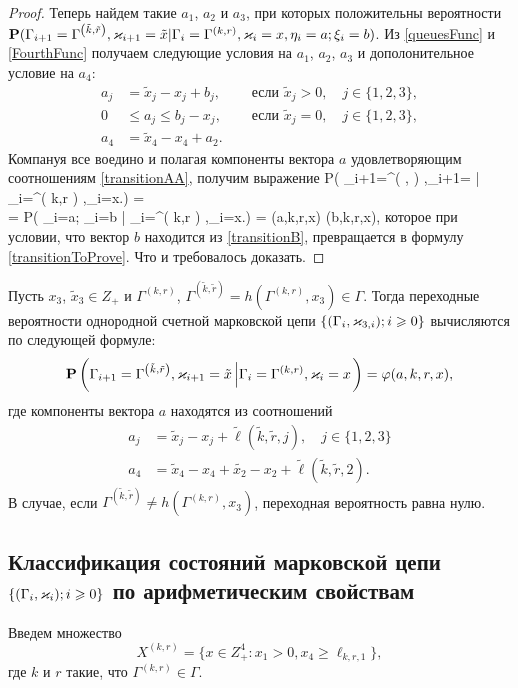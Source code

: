 \documentclass[a4paper,12pt,russian]{extarticle}
\newcommand{\G}{\Gamma}
\newcommand{\Mark}{\{(\G_i, \vk_i); i \geqslant 0\}}
\newcommand{\MarkThree}{\{(\G_i, \vk_{3,i}); i \geqslant 0\}}
\newcommand{\ga}[1]{\Gamma^{\left( #1 \right)} }
\renewcommand{\Pr}{{\mathbf P}}
\renewcommand{\P}[2]{\Pr\left( #1 \left| #2\right.\right)}
\begin{document}
\begin{proof}
Теперь найдем такие $a_1$, $a_2$ и $a_3$, при которых положительны вероятности $\Pr (\G_{i+1}=\ga{\tilde{k},\tilde{r}},\vk_{i+1}=\tilde{x}|\G_{i}=\ga{k,r},\vk_i=x, \eta_i=a; \xi_i=b)$. Из \eqref{queuesFunc} и \eqref{FourthFunc} получаем следующие условия на $a_1$, $a_2$, $a_3$ и дополонительное условие на $a_4$:
\begin{equation}
\begin{aligned}
a_j &=\tilde{x}_j - x_j + b_j, \quad &\text{ если } \tilde{x}_j >0, \quad j \in \{1, 2, 3\}, \\
0 &\leqslant a_j \leqslant  b_j - x_j, \quad &\text{ если } \tilde{x}_j =0, \quad j \in \{1, 2, 3\},\\
a_4 &= \tilde{x}_4 - x_4 +a_2.
\end{aligned}
\label{transitionAA}
\end{equation}
Компануя все воедино и полагая компоненты вектора $a$ удовлетворяющим соотношениям \eqref{transitionAA}, получим выражение
\ml
{
\P{\G_{i+1}=\ga{,},\vk_{i+1}=}{\G_{i}=\ga{k,r},\vk_i=x} = \\
= \P{\eta_i=a; \xi_i=b}{\G_{i}=\ga{k,r},\vk_i=x} = \vp(a,k,r,x)  \times \psi(b,k,r,x),
}
которое при условии, что вектор $b$ находится из \eqref{transitionB}, превращается в формулу \eqref{transitionToProve}. Что и требовалось доказать.
\end{proof}

\begin{theorem}
Пусть $x_3$, $\tilde{x}_3\in Z_+$ и $\ga{k,r}$, $\ga{\tilde{k},\tilde{r}}=h(\ga{k,r},x_3) \in \G$. Тогда переходные вероятности однородной счетной марковской цепи $\MarkThree$ вычисляются по следующей формуле:
\begin{equation}
\P{\G_{i+1}=\ga{\tilde{k},\tilde{r}},\vk_{i+1}=\tilde{x}}{\G_{i}=\ga{k,r},\vk_i=x} 
= \vp(a,k,r,x),
\label{transitionToProve}
\end{equation}
где компоненты вектора $a$ находятся из соотношений
\begin{align}
a_j&=\tilde{x}_j-x_j+\tilde{\ell}(\tilde{k},\tilde{r},j), \quad j\in\{1, 2, 3\}\\
a_4&=\tilde{x}_4-x_4+\tilde{x_2}-x_2+\tilde{\ell}(\tilde{k},\tilde{r},2).
\end{align}
В случае, если $\ga{\tilde{k},\tilde{r}}\neq h(\ga{k,r},x_3)$, переходная вероятность равна нулю.
\end{theorem}

\subsection{Классификация состояний марковской цепи $\Mark$ по арифметическим свойствам}
Введем множество 
\begin{equation*}
X^{(k,r)} = \{x \in Z_+^4 \colon x_1 > 0, x_4 \geqslant \ell_{k,r,1}\},
\end{equation*}
где $k$ и $r$ такие, что $\ga{k,r}\in \G$. 
\end{document}
